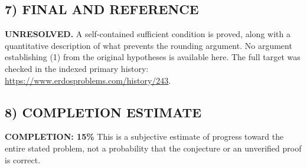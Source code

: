 \subsection*{7) FINAL AND REFERENCE}
\textbf{UNRESOLVED.} A self-contained sufficient condition is proved, along
with a quantitative description of what prevents the rounding argument.
No argument establishing (1) from the original hypotheses is available here.
The full target was checked in the indexed primary history:
\url{https://www.erdosproblems.com/history/243}.

\subsection*{8) COMPLETION ESTIMATE}
\textbf{COMPLETION: 15\%}
This is a subjective estimate of progress toward the entire stated problem, not a probability that the conjecture or an unverified proof is correct.

